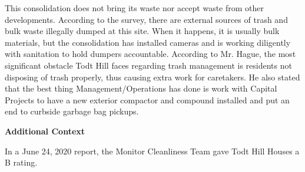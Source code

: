 This consolidation does not bring its waste nor accept waste from other developments. According to the survey, there are external sources of trash and bulk waste illegally dumped at this site. When it happens, it is usually bulk materials, but the consolidation has installed cameras and is working diligently with sanitation to hold dumpers accountable. According to Mr. Hague, the most significant obstacle Todt Hill faces regarding trash management is residents not disposing of trash properly, thus causing extra work for caretakers. He also stated that the best thing Management/Operations has done is work with Capital Projects to have a new exterior compactor and compound installed and put an end to curbside garbage bag pickups.  

\textbf{Additional Context}  

In a June 24, 2020 report, the Monitor Cleanliness Team gave Todt Hill Houses a B rating.  

 